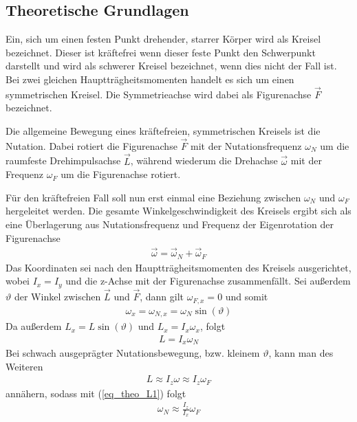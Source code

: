 \documentclass[12pt,a4paper,german]{scrartcl}
\numberwithin{equation}{section}
\begin{document}
  \subsection{Theoretische Grundlagen}
  Ein, sich um einen festen Punkt drehender, starrer Körper wird als Kreisel bezeichnet. Dieser ist kräftefrei wenn dieser feste Punkt den Schwerpunkt darstellt und wird als schwerer Kreisel bezeichnet, wenn dies nicht der Fall ist.
  Bei zwei gleichen Hauptträgheitsmomenten handelt es sich um einen symmetrischen Kreisel.
  Die Symmetrieachse wird dabei als Figurenachse $\vec{F}$ bezeichnet.
  
  Die allgemeine Bewegung eines kräftefreien, symmetrischen Kreisels ist die Nutation.
  Dabei rotiert die Figurenachse $\vec{F}$ mit der Nutationsfrequenz $\omega_N$ um die raumfeste Drehimpulsachse $\vec{L}$, während wiederum die Drehachse $\vec{\omega}$ mit der Frequenz $\omega_F$ um die Figurenachse rotiert.

  Für den kräftefreien Fall soll nun erst einmal eine Beziehung zwischen $\omega_N$ und $\omega_F$ hergeleitet werden.
  Die gesamte Winkelgeschwindigkeit des Kreisels ergibt sich als eine Überlagerung aus Nutationsfrequenz und Frequenz der Eigenrotation der Figurenachse
  \begin{align}
    \vec{\omega} = \vec{\omega}_N + \vec{\omega}_F
  \end{align}
  Das Koordinaten sei nach den Hauptträgheitsmomenten des Kreisels ausgerichtet, wobei $I_x = I_y$ und die z-Achse mit der Figurenachse zusammenfällt.
  Sei außerdem $\vartheta$ der Winkel zwischen $\vec{L}$ und $\vec{F}$, dann gilt $\omega_{F,x} = 0$ und somit
  \begin{align}
    \omega_x = \omega_{N,x} = \omega_N \sin(\vartheta)
  \end{align}
  Da außerdem $L_x = L \sin(\vartheta)$ und $L_x = I_x \omega_x$, folgt
  \begin{align}
    L = I_x \omega_N
    \label{eq_theo_L1}
  \end{align}
  Bei schwach ausgeprägter Nutationsbewegung, bzw. kleinem $\vartheta$, kann man des Weiteren
  \begin{align}
    L \approx I_z \omega \approx I_z \omega_F
  \end{align}
  annähern, sodass mit (\ref{eq_theo_L1}) folgt
  \begin{align}
    \omega_N \approx \frac{I_z}{I_x} \omega_F
    \label{eq_theo_nutation_omegaN_omegaF}
  \end{align}
\end{document}
